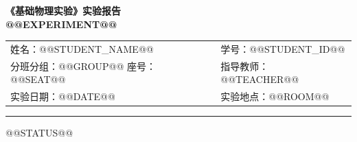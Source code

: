 \documentclass[UTF8,11pt,fontset=fandol]{ctexart}
\begin{document}
\pagestyle{plain}
\begin{center}
{\LARGE\bfseries 《基础物理实验》实验报告}\\[0.8em]
{\large\bfseries @@EXPERIMENT@@}\\[0.5em]
\begin{tabularx}{\textwidth}{@{}X X@{}}
姓名：@@STUDENT_NAME@@ & 学号：@@STUDENT_ID@@\\
分班分组：@@GROUP@@ \quad 座号：@@SEAT@@ & 指导教师：@@TEACHER@@\\
实验日期：@@DATE@@ & 实验地点：@@ROOM@@
\end{tabularx}
\par\smallskip\hrule
\end{center}
@@STATUS@@

\clearpage
\appendix

\end{document}
